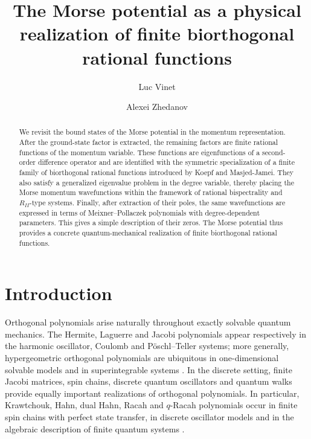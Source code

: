 \documentclass[11pt,reqno]{amsart}
\title[Morse momentum wavefunctions and rational functions]
{The Morse potential as a physical realization of finite biorthogonal rational functions}
\author{Luc Vinet}
\author{Alexei Zhedanov}
\numberwithin{equation}{section}
\begin{document}
\begin{abstract}
We revisit the bound states of the Morse potential in the momentum representation.
After the ground-state factor is extracted, the remaining factors are finite rational
functions of the momentum variable.  These functions are eigenfunctions of a
second-order difference operator and are identified with the symmetric specialization
of a finite family of biorthogonal rational functions introduced by Koepf and
Masjed-Jamei.  They also satisfy a generalized eigenvalue problem in the degree
variable, thereby placing the Morse momentum wavefunctions within the framework
of rational bispectrality and $R_{II}$-type systems.  Finally, after extraction of
their poles, the same wavefunctions are expressed in terms of Meixner--Pollaczek
polynomials with degree-dependent parameters.  This gives a simple description of
their zeros.  The Morse potential thus provides a concrete quantum-mechanical
realization of finite biorthogonal rational functions.
\end{abstract}

\maketitle

\section{Introduction}

Orthogonal polynomials arise naturally throughout exactly solvable quantum
mechanics.  The Hermite, Laguerre and Jacobi polynomials appear respectively in
the harmonic oscillator, Coulomb and P\"oschl--Teller systems; more generally,
hypergeometric orthogonal polynomials are ubiquitous in one-dimensional solvable
models and in superintegrable systems \cite{Chihara1978,Ismail2005,KoekoekLeskySwarttouw2010}.
In the discrete setting, finite Jacobi matrices, spin chains, discrete quantum
oscillators and quantum walks provide equally important realizations of
orthogonal polynomials.  In particular, Krawtchouk, Hahn, dual Hahn, Racah and
$q$-Racah polynomials occur in finite spin chains with perfect state transfer,
in discrete oscillator models and in the algebraic description of finite quantum
systems \cite{Godsil2012,VinetZhedanov2012a,VinetZhedanov2012b,GenestPostVinet2017,GenestVinetZhedanov2014}.
\end{document}

